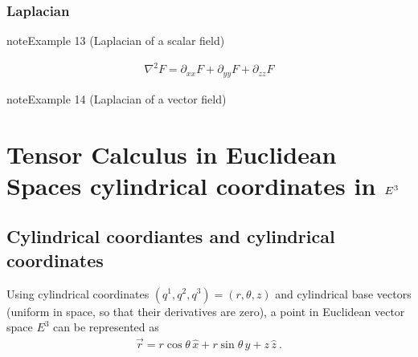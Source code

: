 \documentclass[letterpaper,10pt,english]{jupyterBook}
\begin{document}
\subsubsection{Laplacian}
\label{\detokenize{ch/tensor-algebra-calculus/calculus-euclidean-cartesian:laplacian}}\label{\detokenize{ch/tensor-algebra-calculus/calculus-euclidean-cartesian:tensor-calculus-cartesian-differential-operators-laplacian}}\label{ch/tensor-algebra-calculus/calculus-euclidean-cartesian:example-5}
\begin{sphinxadmonition}{note}{Example 13 (Laplacian of a scalar field)}


\begin{equation*}
\begin{split}\nabla^2 F = \partial_{xx} F + \partial_{yy} F + \partial_{zz} F\end{split}
\end{equation*}\end{sphinxadmonition}
\label{ch/tensor-algebra-calculus/calculus-euclidean-cartesian:example-6}
\begin{sphinxadmonition}{note}{Example 14 (Laplacian of a vector field)}


\end{sphinxadmonition}

\sphinxstepscope


\section{Tensor Calculus in Euclidean Spaces \sphinxhyphen{} cylindrical coordinates in \protect\(E^3\protect\)}
\label{\detokenize{ch/tensor-algebra-calculus/calculus-euclidean-cylindrical:tensor-calculus-in-euclidean-spaces-cylindrical-coordinates-in-e-3}}\label{\detokenize{ch/tensor-algebra-calculus/calculus-euclidean-cylindrical:tensor-calculus-cylindrical}}\label{\detokenize{ch/tensor-algebra-calculus/calculus-euclidean-cylindrical::doc}}

\subsection{Cylindrical coordiantes and cylindrical coordinates}
\label{\detokenize{ch/tensor-algebra-calculus/calculus-euclidean-cylindrical:cylindrical-coordiantes-and-cylindrical-coordinates}}\label{\detokenize{ch/tensor-algebra-calculus/calculus-euclidean-cylindrical:tensor-calculus-cylindrical-coordinates}}
\sphinxAtStartPar
Using cylindrical coordinates \((q^1, q^2, q^3) = (r, \theta, z)\) and cylindrical base vectors (uniform in space, so that their derivatives are zero), a point in Euclidean vector space \(E^3\) can be represented as
\begin{equation*}
\begin{split}\vec{r} = r \cos \theta \, \hat{x} + r \sin \theta \, \hat{y} + z \, \hat{z} \ .\end{split}
\end{equation*}
\end{document}

